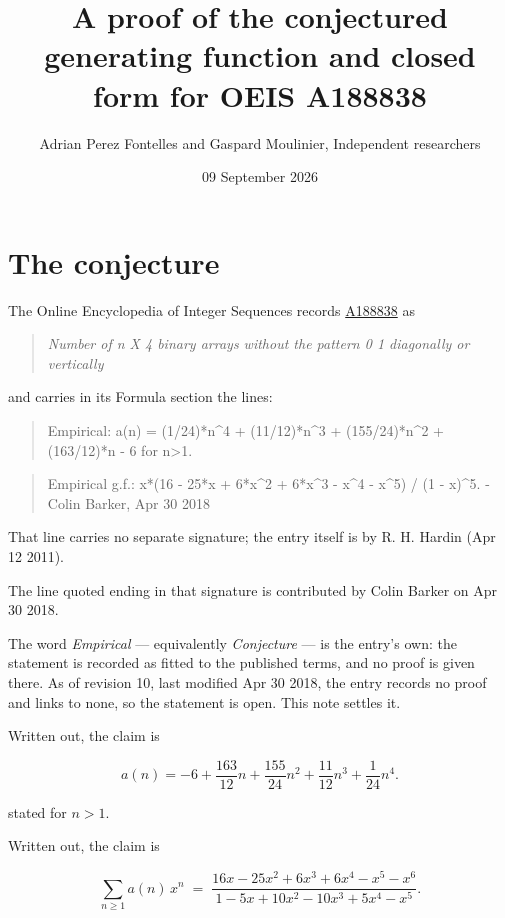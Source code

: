 \documentclass[11pt]{article}
\title{A proof of the conjectured generating function and closed form for OEIS A188838}
\author{Adrian Perez Fontelles and Gaspard Moulinier, Independent researchers}
\date{09 September 2026}
\theoremstyle{definition}
\begin{document}
\maketitle
\section{The conjecture}

The Online Encyclopedia of Integer Sequences records \href{https://oeis.org/A188838}{A188838} as

\begin{quote}\itshape Number of n X 4 binary arrays without the pattern 0 1 diagonally or vertically\end{quote}

and carries in its Formula section the lines:

\begin{quote}\ttfamily Empirical: a(n) = (1/24)*n\textasciicircum{}4 + (11/12)*n\textasciicircum{}3 + (155/24)*n\textasciicircum{}2 + (163/12)*n - 6 for n>1.\end{quote}

\begin{quote}\ttfamily Empirical g.f.: x*(16 - 25*x + 6*x\textasciicircum{}2 + 6*x\textasciicircum{}3 - x\textasciicircum{}4 - x\textasciicircum{}5) / (1 - x)\textasciicircum{}5. - Colin Barker, Apr 30 2018\end{quote}

That line carries no separate signature; the entry itself is by R. H. Hardin (Apr 12 2011).

The line quoted ending in that signature is contributed by Colin Barker on Apr 30 2018.

The word {\itshape Empirical} --- equivalently {\itshape Conjecture} --- is the entry's own: the statement is recorded as fitted to the published terms, and no proof is given there. As of revision 10, last modified Apr 30 2018, the entry records no proof and links to none, so the statement is open. This note settles it.

Written out, the claim is

\[a(n) = -6 + \frac{163}{12}n + \frac{155}{24}n^{2} + \frac{11}{12}n^{3} + \frac{1}{24}n^{4}.\]

stated for $n > 1$.

Written out, the claim is

\[\sum_{n \ge 1} a(n)\,x^n \;=\; \frac{16x - 25x^{2} + 6x^{3} + 6x^{4} - x^{5} - x^{6}}{1 - 5x + 10x^{2} - 10x^{3} + 5x^{4} - x^{5}}.\]
\end{document}
